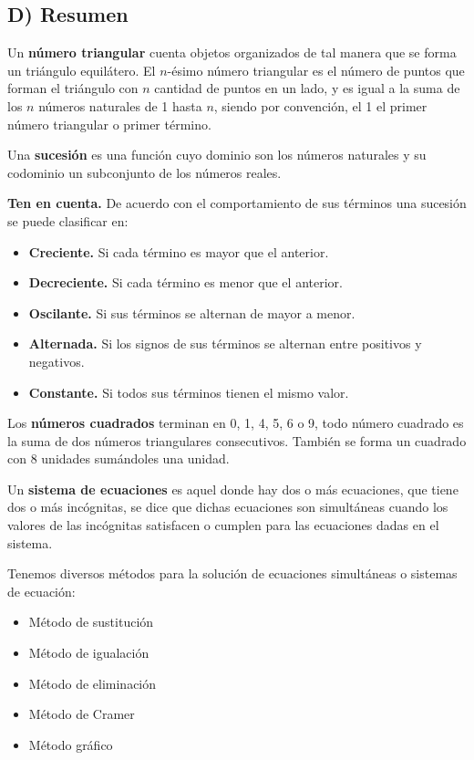 \documentclass[12pt,a4paper]{article}
\begin{document}
\vspace{1.5cm}

\subsection*{D) Resumen}

Un \textbf{número triangular} cuenta objetos organizados de tal manera que se forma un triángulo equilátero. El $n$-ésimo número triangular es el número de puntos que forman el triángulo con $n$ cantidad de puntos en un lado, y es igual a la suma de los $n$ números naturales de 1 hasta $n$, siendo por convención, el 1 el primer número triangular o primer término.

Una \textbf{sucesión} es una función cuyo dominio son los números naturales y su codominio un subconjunto de los números reales.

\textbf{Ten en cuenta.} De acuerdo con el comportamiento de sus términos una sucesión se puede clasificar en:

\begin{itemize}
    \item \textbf{Creciente.} Si cada término es mayor que el anterior.
    \item \textbf{Decreciente.} Si cada término es menor que el anterior.
    \item \textbf{Oscilante.} Si sus términos se alternan de mayor a menor.
    \item \textbf{Alternada.} Si los signos de sus términos se alternan entre positivos y negativos.
    \item \textbf{Constante.} Si todos sus términos tienen el mismo valor.
\end{itemize}

Los \textbf{números cuadrados} terminan en 0, 1, 4, 5, 6 o 9, todo número cuadrado es la suma de dos números triangulares consecutivos. También se forma un cuadrado con 8 unidades sumándoles una unidad.

Un \textbf{sistema de ecuaciones} es aquel donde hay dos o más ecuaciones, que tiene dos o más incógnitas, se dice que dichas ecuaciones son simultáneas cuando los valores de las incógnitas satisfacen o cumplen para las ecuaciones dadas en el sistema.

Tenemos diversos métodos para la solución de ecuaciones simultáneas o sistemas de ecuación:

\begin{itemize}
    \item Método de sustitución
    \item Método de igualación
    \item Método de eliminación
    \item Método de Cramer
    \item Método gráfico
\end{itemize}
\end{document}
